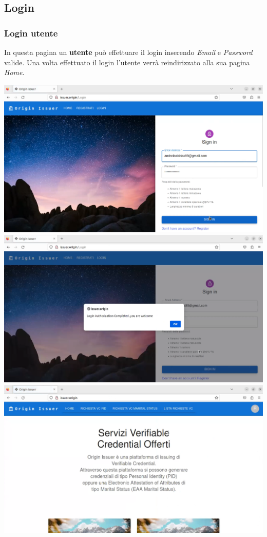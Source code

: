 \subsection{Login}
\subsubsection{Login utente}
In questa pagina un \textbf{utente} può effettuare il login inserendo \textit{Email} e \textit{Password} valide. Una volta effettuato il login l'utente verrà reindirizzato alla sua pagina \textit{Home}.
\begin{center}
    \includegraphics[scale = 0.2]{./res/img/issuer/new/login1.png}
    \includegraphics[scale = 0.2]{./res/img/issuer/new/login2.png}
    \includegraphics[scale = 0.2]{./res/img/issuer/new/login3.png}
\end{center}




